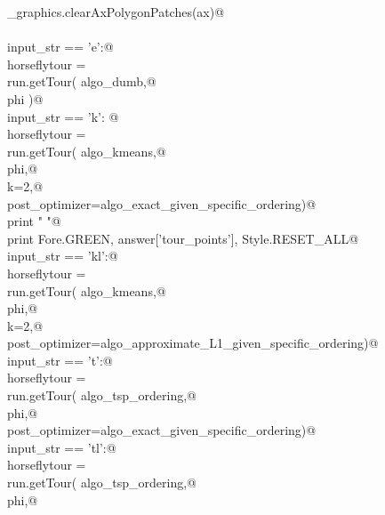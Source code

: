 \documentclass[11.5pt]{report}
\begin{document}
\begin{flushleft}
\begin{list}{}{}
\mbox{}\verb@utils_graphics.clearAxPolygonPatches(ax)@\\
\mbox{}\verb@@\\
\mbox{}\verb@if   input_str == 'e':@\\
\mbox{}\verb@      horseflytour = \@\\
\mbox{}\verb@             run.getTour( algo_dumb,@\\
\mbox{}\verb@                          phi )@\\
\mbox{}\verb@elif input_str == 'k': @\\
\mbox{}\verb@      horseflytour = \@\\
\mbox{}\verb@             run.getTour( algo_kmeans,@\\
\mbox{}\verb@                          phi,@\\
\mbox{}\verb@                          k=2,@\\
\mbox{}\verb@                          post_optimizer=algo_exact_given_specific_ordering)@\\
\mbox{}\verb@      print " "@\\
\mbox{}\verb@      print Fore.GREEN, answer['tour_points'], Style.RESET_ALL@\\
\mbox{}\verb@elif input_str == 'kl':@\\
\mbox{}\verb@      horseflytour = \@\\
\mbox{}\verb@             run.getTour( algo_kmeans,@\\
\mbox{}\verb@                          phi,@\\
\mbox{}\verb@                          k=2,@\\
\mbox{}\verb@                          post_optimizer=algo_approximate_L1_given_specific_ordering)@\\
\mbox{}\verb@elif input_str == 't':@\\
\mbox{}\verb@      horseflytour = \@\\
\mbox{}\verb@             run.getTour( algo_tsp_ordering,@\\
\mbox{}\verb@                          phi,@\\
\mbox{}\verb@                          post_optimizer=algo_exact_given_specific_ordering)@\\
\mbox{}\verb@elif input_str == 'tl':@\\
\mbox{}\verb@      horseflytour = \@\\
\mbox{}\verb@             run.getTour( algo_tsp_ordering,@\\
\mbox{}\verb@                          phi,@\\

\end{list}
\end{flushleft}
\end{document}
